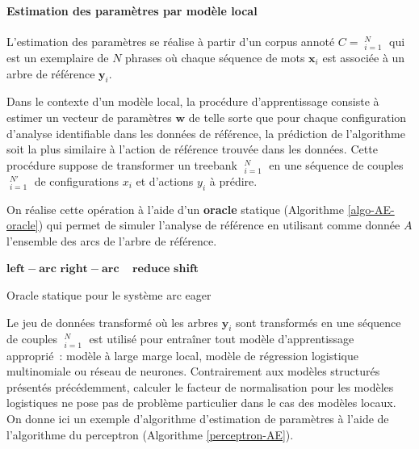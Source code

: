 \documentclass[11pt,openany]{book}
\begin{document}
\paragraph{Estimation des paramètres par modèle local}
L'estimation des paramètres se réalise à partir d'un 
corpus annoté $C = \mathop{(\mathbf{x}_i,\mathbf{y}_i)}^N_{i=1}$ qui est un
exemplaire de $N$ phrases où chaque séquence de mots $\mathbf{x}_i$
est associée à un arbre de référence $\mathbf{y}_i$.

Dans le contexte d'un modèle local, la procédure d'apprentissage consiste à estimer un vecteur de
paramètres $\mathbf{w}$ de telle sorte que pour chaque configuration
d'analyse identifiable dans les données de référence, la prédiction de
l'algorithme soit la plus similaire à l'action de référence trouvée
dans les données. Cette procédure suppose de transformer un treebank
$\mathop{(\mathbf{x}_i,\mathbf{y}_i)}^N_{i=1}$
en une séquence de couples $\mathop{(x_i,y_i)}_{i=1}^{N'}$
de configurations $x_i$ et d'actions $y_i$ à prédire.

On réalise cette opération à l'aide d'un {\bf oracle} statique
(Algorithme \ref{algo-AE-oracle}) qui permet de simuler l'analyse de référence en utilisant
comme donnée $A$ l'ensemble des arcs de l'arbre de référence. 

\begin{algorithm}
\scriptsize
\begin{algorithmic}[0]
 
\State \Return $\mathbf{left-arc}$
\State \Return $\mathbf{right-arc}$
\EndIf
\EndIf
{}\
\State \Return $\mathbf{reduce}$
\EndIf
\EndIf
{}\Comment{Il y a au moins 1 élément dans le
  buffer}\State\Return $\mathbf{shift}$
\EndIf
\EndFunction
\end{algorithmic}
\caption{\label{algo-AE-oracle} Oracle statique pour le système arc
  eager}
\end{algorithm}
Le jeu de données transformé où les arbres $\mathbf{y}_i$ sont
transformés en une séquence de couples $\mathop{(x_i,t_i)}_{i=1}^N$
est utilisé pour entraîner tout modèle d'apprentissage approprié~:
modèle à large marge local, modèle de régression logistique
multinomiale ou réseau de neurones. Contrairement aux modèles
structurés présentés précédemment, calculer le facteur de
normalisation pour les modèles logistiques ne pose pas de problème
particulier dans le cas des modèles locaux. On donne ici un exemple
d'algorithme d'estimation
de paramètres  à l'aide de l'algorithme du
perceptron (Algorithme \ref{perceptron-AE}).
\end{document}
